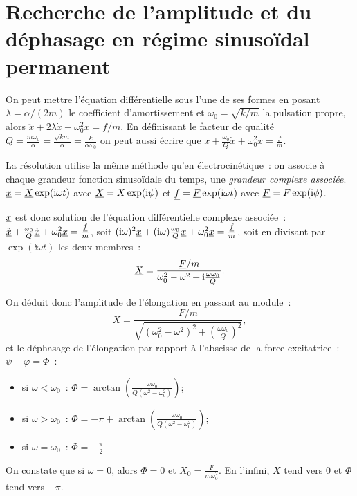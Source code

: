\section{Recherche de l'amplitude et du déphasage en régime sinusoïdal
permanent}
On peut mettre l'équation différentielle sous l'une de ses formes en posant
\(\lambda = \alpha/(2m)\) le coefficient d'amortissement et
\(\omega_0=\sqrt{k/m}\) la pulsation propre, alors \(\ddot{x}+2\lambda
\dot{x}+\omega_0^2x = f/m\).
En définissant le facteur de qualité \(Q =
\frac{m\omega_0}{\alpha}=\frac{\sqrt{km}}{\alpha}=\frac{k}{\alpha\omega_0}\) on
peut aussi écrire que \(\ddot{x}+\frac{\omega_0}{Q}\dot{x}+\omega_0^2
x=\frac{f}{m}\).

La résolution utilise la même méthode qu'en électrocinétique~: on associe à
chaque grandeur fonction sinusoïdale du temps, une \emph{grandeur complexe
associée}.
\(\underline{x} = \underline{X}\exp(\mathrm{i}\omega t)\) avec \(\underline{X} = X\exp(\mathrm{i}\psi)\) et \(\underline{f} =
\underline{F}\exp(\mathrm{i}\omega t)\) avec \(\underline{F} = F\exp(\mathrm{i}\phi)\).

\(\underline{x}\) est donc solution de l'équation différentielle complexe associée~:
\(\ddot{\underline{x}}+\frac{\omega_0}{Q}\dot{\underline{x}}+\omega_0^2 \underline{x}=\frac{\underline{f}}{m}\), soit
\((\mathrm{i}\omega)^2\underline{x} + (\mathrm{i}\omega)\frac{\omega_0}{Q}\underline{x}+\omega_0^2\underline{x} =
\frac{\underline{f}}{m}\), soit en divisant par \(\exp(\ii\omega t)\) les deux membres~:
\begin{equation}
  \label{eq:elongationcomplexe}
  \underline{X} = \frac{\underline{F}/m}{\omega_0^2-\omega^2+\mathrm{i}\frac{\omega\omega_0}{Q}}.
\end{equation}

On déduit donc l'amplitude de l'élongation en passant au module~:
\begin{equation}
  X =
  \frac{F/m}{\sqrt{(\omega_0^2-\omega^2)^2+\left(\frac{\omega\omega_0}{Q}\right)^2}},
\end{equation}
et le déphasage de l'élongation par rapport à l'abscisse de la force
excitatrice~: \(\psi-\varphi = \Phi\)~: \begin{itemize}
  \item si \(\omega<\omega_0\)~: \(\Phi =
    \arctan(\frac{\omega\omega_0}{Q(\omega^2-\omega_0^2)})\);
  \item si \(\omega>\omega_0\)~: \(\Phi = -\pi +
    \arctan(\frac{\omega\omega_0}{Q(\omega^2-\omega_0^2)})\);
  \item si \(\omega=\omega_0\)~: \(\Phi = -\frac{\pi}{2}\)
\end{itemize}
On constate que si \(\omega = 0\), alors \(\Phi=0\) et \(X_0 =
\frac{F}{m\omega_0^2}\). En l'infini, \(X\) tend vers 0 et \(\Phi\) tend vers
\(-\pi\).

